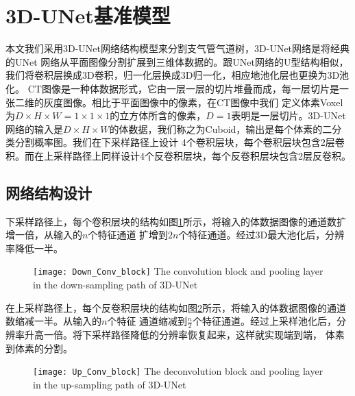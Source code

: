 \section{3D-UNet基准模型}
本文我们采用3D-UNet\cite{cciccek20163d}网络结构模型来分割支气管气道树，3D-UNet网络是将经典的UNet\cite{ronneberger2015u}
网络从平面图像分割扩展到三维体数据的。跟UNet网络的U型结构相似，我们将卷积层换成3D卷积，归一化层换成3D归一化，相应地池化层也更换为3D池化。
CT图像是一种体数据形式，它由一层一层的切片堆叠而成，每一层切片是一张二维的灰度图像。相比于平面图像中的像素，在CT图像中我们
定义体素Voxel为$D \times H \times W = 1 \times 1 \times 1$的立方体所含的像素，$D = 1$表明是一层切片。3D-UNet
网络的输入是$D \times H \times W$的体数据，我们称之为Cuboid，输出是每个体素的二分类分割概率图。我们在下采样路径上设计
4个卷积层块，每个卷积层块包含2层卷积。而在上采样路径上同样设计4个反卷积层块，每个反卷积层块包含2层反卷积。

\subsection{网络结构设计}

下采样路径上，每个卷积层块的结构如图\ref{fig:convblock}所示，将输入的体数据图像的通道数扩增一倍，从输入的$n$个特征通道
扩增到$2n$个特征通道。经过3D最大池化后，分辨率降低一半。
\begin{figure}[h]
    \centering
    \texttt{[image: Down\_Conv\_block]}
        {The convolution block and pooling layer in the down-sampling path of 3D-UNet}
    \label{fig:convblock}
\end{figure}

在上采样路径上，每个反卷积层块的结构如图\ref{fig:deconvblock}所示，将输入的体数据图像的通道数缩减一半。从输入的$n$个特征
通道缩减到$\frac{n}{2}$个特征通道。经过上采样池化后，分辨率升高一倍。将下采样路径降低的分辨率恢复起来，这样就实现端到端，
体素到体素的分割。
\begin{figure}[h]
    \centering
    \texttt{[image: Up\_Conv\_block]}
        {The deconvolution block and pooling layer in the up-sampling path of 3D-UNet}
    \label{fig:deconvblock}
\end{figure}

